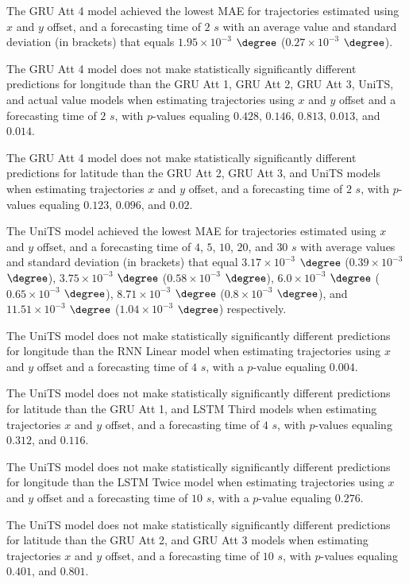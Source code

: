 The GRU Att 4 model achieved the lowest MAE for trajectories estimated using $x$ and $y$ offset, and a forecasting time of $2$ $s$ with an average value and standard deviation (in brackets) that equals $1.95 \times 10^{-3}$ $\degree$ ($0.27 \times 10^{-3}$ $\degree$).

The GRU Att 4 model does not make statistically significantly different predictions for longitude than the GRU Att 1, GRU Att 2, GRU Att 3, UniTS, and actual value models when estimating trajectories using $x$ and $y$ offset and a forecasting time of $2$ $s$, with $p$-values equaling $0.428$, $0.146$, $0.813$, $0.013$, and $0.014$.

The GRU Att 4 model does not make statistically significantly different predictions for latitude than the GRU Att 2, GRU Att 3, and UniTS models when estimating trajectories $x$ and $y$ offset, and a forecasting time of $2$ $s$, with $p$-values equaling $0.123$, $0.096$, and $0.02$.

The UniTS model achieved the lowest MAE for trajectories estimated using $x$ and $y$ offset, and a forecasting time of $4$, $5$, $10$, $20$, and $30$ $s$ with average values and standard deviation (in brackets) that equal $3.17 \times 10^{-3}$ $\degree$ ($0.39 \times 10^{-3}$ $\degree$), $3.75 \times 10^{-3}$ $\degree$ ($0.58 \times 10^{-3}$ $\degree$), $6.0 \times 10^{-3}$ $\degree$ ($0.65 \times 10^{-3}$ $\degree$), $8.71 \times 10^{-3}$ $\degree$ ($0.8 \times 10^{-3}$ $\degree$), and $11.51 \times 10^{-3}$ $\degree$ ($1.04 \times 10^{-3}$ $\degree$) respectively.

The UniTS model does not make statistically significantly different predictions for longitude than the RNN Linear model when estimating trajectories using $x$ and $y$ offset and a forecasting time of $4$ $s$, with a $p$-value equaling $0.004$.

The UniTS model does not make statistically significantly different predictions for latitude than the GRU Att 1, and LSTM Third models when estimating trajectories $x$ and $y$ offset, and a forecasting time of $4$ $s$, with $p$-values equaling $0.312$, and $0.116$.

The UniTS model does not make statistically significantly different predictions for longitude than the LSTM Twice model when estimating trajectories using $x$ and $y$ offset and a forecasting time of $10$ $s$, with a $p$-value equaling $0.276$.

The UniTS model does not make statistically significantly different predictions for latitude than the GRU Att 2, and GRU Att 3 models when estimating trajectories $x$ and $y$ offset, and a forecasting time of $10$ $s$, with $p$-values equaling $0.401$, and $0.801$.

